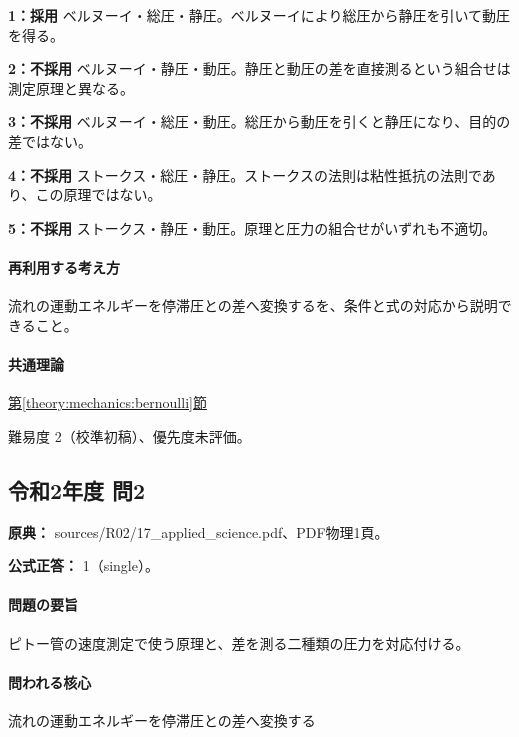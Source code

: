 \noindent\textbf{1：採用} ベルヌーイ・総圧・静圧。ベルヌーイにより総圧から静圧を引いて動圧を得る。\par

\noindent\textbf{2：不採用} ベルヌーイ・静圧・動圧。静圧と動圧の差を直接測るという組合せは測定原理と異なる。\par

\noindent\textbf{3：不採用} ベルヌーイ・総圧・動圧。総圧から動圧を引くと静圧になり、目的の差ではない。\par

\noindent\textbf{4：不採用} ストークス・総圧・静圧。ストークスの法則は粘性抵抗の法則であり、この原理ではない。\par

\noindent\textbf{5：不採用} ストークス・静圧・動圧。原理と圧力の組合せがいずれも不適切。\par

\paragraph{再利用する考え方} 流れの運動エネルギーを停滞圧との差へ変換するを、条件と式の対応から説明できること。

\paragraph{共通理論} \hyperref[theory:mechanics:bernoulli]{第\ref*{theory:mechanics:bernoulli}節}

\par 難易度 2（校準初稿）、優先度未評価。

\subsection{令和2年度 問2}
\label{q:r02-reg-applied-02}

\noindent\textbf{原典：} sources/R02/17\_applied\_science.pdf、PDF物理1頁。

\textbf{公式正答：} 1（single）。

\paragraph{問題の要旨} ピトー管の速度測定で使う原理と、差を測る二種類の圧力を対応付ける。

\paragraph{問われる核心} 流れの運動エネルギーを停滞圧との差へ変換する

